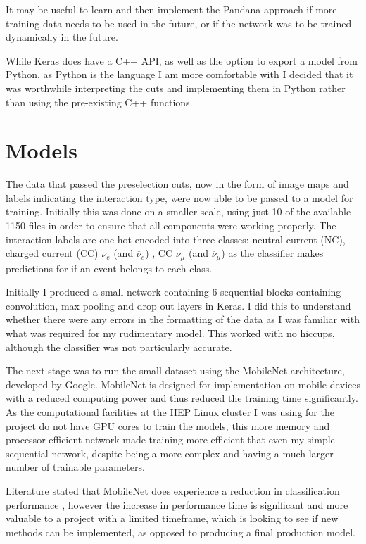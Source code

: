 \noindent It may be useful to learn and then implement the Pandana approach if more training data needs to be used in the future, or if the network was to be trained dynamically in the future.\medskip

\noindent While Keras does have a C++ API, as well as the option to export a model from Python, as Python is the language I am more comfortable with I decided that it was worthwhile interpreting the cuts and implementing them in Python rather than using the pre-existing C++ functions.\medskip

\section{Models}

\noindent The data that passed the preselection cuts, now in the form of image maps and labels indicating the interaction type, were now able to be passed to a model for training. Initially this was done on a smaller scale, using just 10 of the available 1150 files in order to ensure that all components were working properly. The interaction labels are one hot encoded into three classes: neutral current (NC), charged current  (CC) $\nu_e$  (and  ${\overline{\nu}_e}$) , CC $\nu_\mu$  (and  ${\overline{\nu}_\mu}$) as the classifier makes predictions for if an event belongs to each class.\medskip

\noindent Initially I produced a small network containing 6 sequential blocks containing convolution, max pooling and drop out layers in Keras. I did this to understand whether there were any errors in the formatting of the data as I was familiar with what was required for my rudimentary model. This worked with no hiccups, although the classifier was not particularly accurate. \medskip

\noindent The next stage was to run the small dataset using the MobileNet \cite{Sandler} architecture, developed by Google.  MobileNet is designed for implementation on mobile devices with a reduced computing power and thus reduced the training time significantly. As the computational facilities at the HEP Linux cluster I was using for the project do not have GPU cores to train the models, this more memory and processor efficient network made training more efficient that even my simple sequential network, despite being a more complex and having a much larger number of trainable parameters.\medskip

\noindent Literature stated that MobileNet does experience a reduction in classification performance \cite{Brun}, however the increase in performance time is significant and more valuable to a project with a limited timeframe, which is looking to see if new methods can be implemented, as opposed to producing a final production model.\medskip

